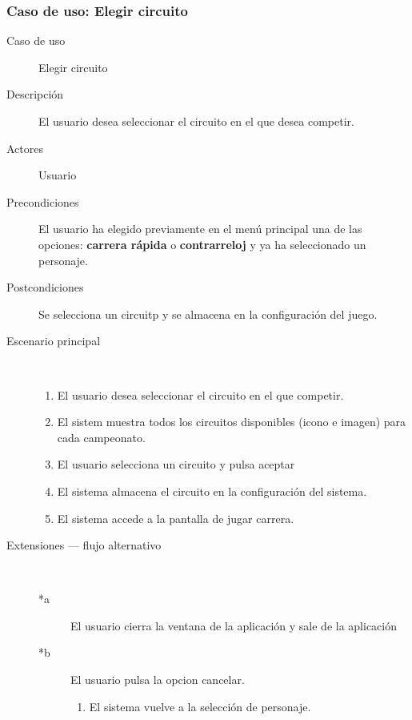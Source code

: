 \subsubsection{Caso de uso: Elegir circuito}

\begin{description}
    \item[Caso de uso] Elegir circuito
    \item[Descripción] El usuario desea seleccionar el circuito en el que desea competir.
    \item[Actores] Usuario
    \item[Precondiciones] El usuario ha elegido previamente en el menú principal una de las opciones: \textbf{carrera rápida} 
    o \textbf{contrarreloj} y ya ha seleccionado un personaje.
    
    \item[Postcondiciones] Se selecciona un circuitp y se almacena en la configuración del juego.
    \item[Escenario principal] $\quad$
        \begin{enumerate}
            \item El usuario desea seleccionar el circuito en el que competir.
            \item El sistem muestra todos los circuitos disponibles (icono e imagen) para cada campeonato.
            \item El usuario selecciona un circuito y pulsa aceptar
            \item El sistema almacena el circuito en la configuración del sistema.
            \item El sistema accede a la pantalla de jugar carrera.
        \end{enumerate}
    \item[Extensiones --- flujo alternativo] $\quad$
        \begin{description}
            \item[*a ] El usuario cierra la ventana de la aplicación y sale de la aplicación
            \item[*b ] El usuario pulsa la opcion cancelar.
            \begin{enumerate}
                \item El sistema vuelve a la selección de personaje.
            \end{enumerate}
        \end{description}
\end{description}

